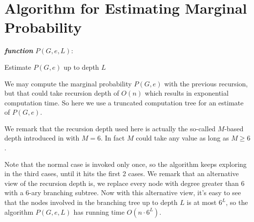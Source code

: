 
\section{Algorithm for Estimating Marginal Probability}

\IncMargin{1em}
\begin{algorithm}[H]
\emph{ \textbf{function} $P(G, e, L):$}
\BlankLine
{}
 \caption{Estimate $P(G,e)$ up to depth $L$}
\end{algorithm}
\DecMargin{1em}

We may compute the marginal probability $P(G, e)$ with the previous recursion, but
that could take recursion depth of $O(n)$ which results in exponential computation time.
So here we use a truncated computation tree for an estimate of $P(G,e)$.

We remark that the recursion depth used here is actually the so-called $M$-based depth introduced in \cite{LLY12} with $M=6$. In fact $M$ could take any value as long as $M \geq 6$. %


Note that the normal case is invoked only once, so the algorithm keeps exploring in the third cases, until it hits the first 2 cases. We remark that an alternative view of the recursion depth is, we replace every node with degree greater than 6 with a $6$-ary branching subtree. 
Now with this alternative view, it's easy to see that the nodes involved in the branching tree up to depth $L$ is at most $6^L$,
so the algorithm $P(G,e,L)$ has running time $O(n \cdot 6^L)$.
%

